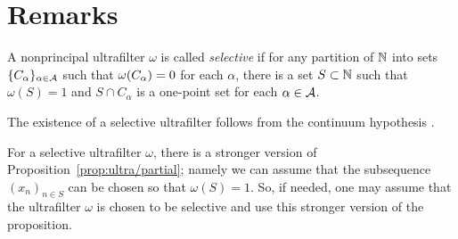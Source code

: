 \section{Remarks}

A nonprincipal ultrafilter $\omega$ is called 
\emph{selective} if for any partition of $\mathbb{N}$ into sets $\{C_\alpha\}_{\alpha\in\mathcal{A}}$ such that $\omega(C_\alpha)\z=0$ for each $\alpha$, 
there is a set $S\subset \mathbb{N}$ such that $\omega(S)=1$ and $S\cap C_\alpha$ is a one-point set for each $\alpha\in\mathcal{A}$.

The existence of a selective ultrafilter follows from the continuum hypothesis \cite{rudin}.

For a selective ultrafilter $\omega$, there is a stronger version of Proposition~\ref{prop:ultra/partial};
namely we can assume that the subsequence $(x_n)_{n\in S}$ can be chosen so that $\omega(S)=1$.
So, if needed, one may assume that the ultrafilter $\omega$ is chosen to be selective and use this stronger version of the proposition.
